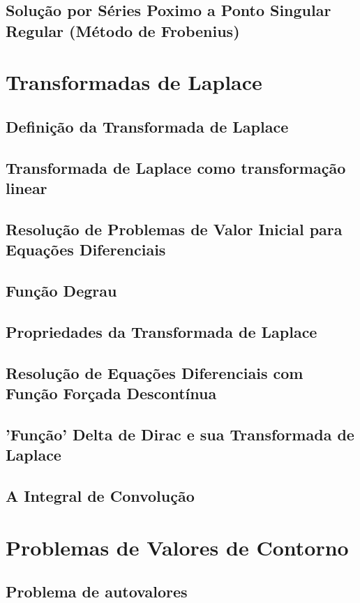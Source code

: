 \documentclass{article}
\begin{document}
\subsection{Solução por Séries Poximo a Ponto Singular Regular (Método de Frobenius)}

\section{Transformadas de Laplace}

\subsection{Definição da Transformada de Laplace}
\subsection{Transformada de Laplace como transformação linear}
\subsection{Resolução de Problemas de Valor Inicial para Equações Diferenciais}
\subsection{Função Degrau}
\subsection{Propriedades da Transformada de Laplace}
\subsection{Resolução de Equações Diferenciais com Função Forçada Descontínua}
\subsection{'Função' Delta de Dirac e sua Transformada de Laplace}
\subsection{A Integral de Convolução}

\section{Problemas de Valores de Contorno}
\subsection{Problema de autovalores}
\end{document}
